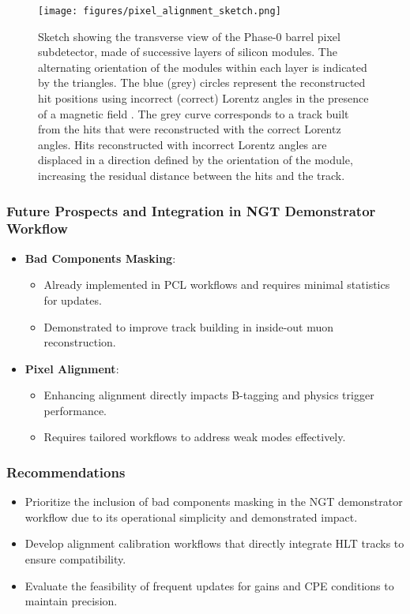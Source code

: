\begin{figure}[htbp]
   \centering
	\texttt{[image: figures/pixel\_alignment\_sketch.png]}
   \caption{Sketch showing the transverse view of the Phase-0 barrel pixel subdetector, made of successive layers of silicon modules. The alternating orientation of the modules within each layer is indicated by the triangles. The blue (grey) circles represent the reconstructed hit positions using incorrect (correct) Lorentz angles in the presence of a magnetic field . The grey curve corresponds to a track built from the hits that were reconstructed with the correct Lorentz angles. Hits reconstructed with incorrect Lorentz angles are displaced in a direction defined by the orientation of the module, increasing the residual distance between the hits and the track. \cite{CMS:2022ali}}
   \label{fig:pixelAlignment}
\end{figure}

\subsubsection*{Future Prospects and Integration in NGT Demonstrator Workflow}
\begin{itemize}
    \item \textbf{Bad Components Masking}:
    \begin{itemize}
        \item Already implemented in PCL workflows and requires minimal statistics for updates.
        \item Demonstrated to improve track building in inside-out muon reconstruction.
    \end{itemize}
    \item \textbf{Pixel Alignment}:
    \begin{itemize}
        \item Enhancing alignment directly impacts B-tagging and physics trigger performance.
        \item Requires tailored workflows to address weak modes effectively.
    \end{itemize}
\end{itemize}

\subsubsection*{Recommendations}
\begin{itemize}
    \item Prioritize the inclusion of bad components masking in the NGT demonstrator workflow due to its operational simplicity and demonstrated impact.
    \item Develop alignment calibration workflows that directly integrate HLT tracks to ensure compatibility.
    \item Evaluate the feasibility of frequent updates for gains and CPE conditions to maintain precision.
\end{itemize}